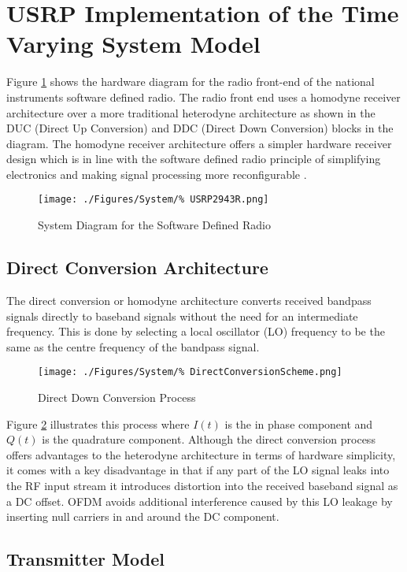 \section{USRP Implementation of the Time Varying System Model}

Figure \ref{fig:USRPDiagram} shows the hardware diagram %
for the radio front-end of the national instruments %
software defined radio. The radio front end uses a homodyne %
receiver architecture over a more traditional heterodyne %
architecture as shown in the DUC (Direct Up Conversion) and %
DDC (Direct Down Conversion) blocks in the diagram. The homodyne %
receiver architecture offers a simpler hardware receiver design %
which is in line with the software defined radio principle of %
simplifying electronics and making signal processing more %
reconfigurable \cite{Dillinger03}.
\begin{figure}[ht]
	\texttt{[image: ./Figures/System/\%
	USRP2943R.png]}
	\caption{System Diagram for the Software Defined Radio%
	\cite{USRPDiagram}}
	\label{fig:USRPDiagram}
\end{figure}

\subsection{Direct Conversion Architecture}
\label{subsec:DirectConversion}
The direct conversion or homodyne architecture converts received %
bandpass signals directly to baseband signals without the need for %
an intermediate frequency. This is done by selecting a local %
oscillator (LO) frequency to be the same as the centre %
frequency of the bandpass signal.
\begin{figure}[ht]
	\centering
	\texttt{[image: ./Figures/System/\%
	DirectConversionScheme.png]}
	\caption{Direct Down Conversion Process}
	\label{fig:DDC}
\end{figure}
Figure \ref{fig:DDC} illustrates this process where $I(t)$ is the %
in phase component and $Q(t)$ is the quadrature component. %
Although the direct conversion process offers advantages to the %
heterodyne architecture in terms of hardware simplicity, it comes %
with a key disadvantage in that if any part of the LO signal %
leaks into the RF input stream it introduces distortion into the %
received baseband signal as a DC offset. OFDM avoids %
additional interference caused by this LO leakage by inserting %
null carriers in and around the DC component.

\subsection{Transmitter Model}

